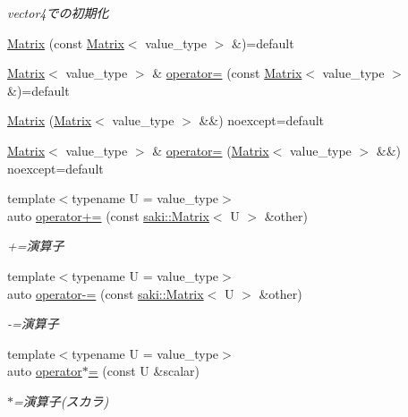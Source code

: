 \begin{DoxyCompactItemize}
\begin{DoxyCompactList}\small\item\em vector4での初期化 \end{DoxyCompactList}\item 
\mbox{\hyperlink{classsaki_1_1_matrix_a6ab873007903b2d999fbe112b64e2536}{Matrix}} (const \mbox{\hyperlink{classsaki_1_1_matrix}{Matrix}}$<$ value\+\_\+type $>$ \&)=default
\item 
\mbox{\hyperlink{classsaki_1_1_matrix}{Matrix}}$<$ value\+\_\+type $>$ \& \mbox{\hyperlink{classsaki_1_1_matrix_a1bb0e9517045aafd626e5083b5ffd451}{operator=}} (const \mbox{\hyperlink{classsaki_1_1_matrix}{Matrix}}$<$ value\+\_\+type $>$ \&)=default
\item 
\mbox{\hyperlink{classsaki_1_1_matrix_ac9348cfbd23fc23bdb2e00cabbff6c66}{Matrix}} (\mbox{\hyperlink{classsaki_1_1_matrix}{Matrix}}$<$ value\+\_\+type $>$ \&\&) noexcept=default
\item 
\mbox{\hyperlink{classsaki_1_1_matrix}{Matrix}}$<$ value\+\_\+type $>$ \& \mbox{\hyperlink{classsaki_1_1_matrix_a1eed1469e0680969c0a0c4aab1f198fe}{operator=}} (\mbox{\hyperlink{classsaki_1_1_matrix}{Matrix}}$<$ value\+\_\+type $>$ \&\&) noexcept=default
\item 
{\footnotesize template$<$typename U  = value\+\_\+type$>$ }\\auto \mbox{\hyperlink{classsaki_1_1_matrix_a5361db043630dee8f98de089c5df6ed1}{operator+=}} (const \mbox{\hyperlink{classsaki_1_1_matrix}{saki\+::\+Matrix}}$<$ U $>$ \&other)
\begin{DoxyCompactList}\small\item\em +=演算子 \end{DoxyCompactList}\item 
{\footnotesize template$<$typename U  = value\+\_\+type$>$ }\\auto \mbox{\hyperlink{classsaki_1_1_matrix_a1cd8758e3e4d8eb58cee148e71cbed45}{operator-\/=}} (const \mbox{\hyperlink{classsaki_1_1_matrix}{saki\+::\+Matrix}}$<$ U $>$ \&other)
\begin{DoxyCompactList}\small\item\em -\/=演算子 \end{DoxyCompactList}\item 
{\footnotesize template$<$typename U  = value\+\_\+type$>$ }\\auto \mbox{\hyperlink{classsaki_1_1_matrix_aae1ffee9f67e7c9893a2329c75bd8a51}{operator$\ast$=}} (const U \&scalar)
\begin{DoxyCompactList}\small\item\em $\ast$=演算子(スカラ) \end{DoxyCompactList}\item 

\end{DoxyCompactItemize}
